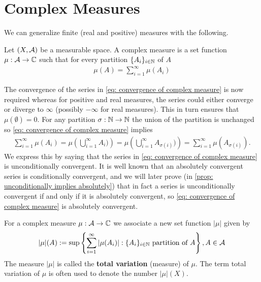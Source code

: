 \section{Complex Measures}

We can generalize finite (real and positive) measures with the following.

\begin{definition}
Let $(X, \mathcal{A})$ be a measurable space. A complex measure is a set function $\mu: \mathcal{A} \to \mathbb{C}$ such that for every partition $\{A_{i}\}_{i\in \mathbb{N}}$ of $A$
\begin{align}
	\mu(A) = \sum_{i=1}^{\infty}\mu(A_{i}) \label{eq: convergence of complex measure}
\end{align}
\end{definition}
The convergence of the series in \eqref{eq: convergence of complex measure} is now required whereas for positive and real measures, the series could either converge or diverge to $\infty$ (possibly $-\infty$ for real measures). This in turn ensures that $\mu(\emptyset)=0$.
For any partition $\sigma: \mathbb{N} \to \mathbb{N}$ the union of the partition is unchanged so \eqref{eq: convergence of complex measure} implies
\begin{align*}
	\sum_{i=1}^{\infty}\mu(A_{i}) = \mu\left(\bigcup_{i=1}^{\infty}A_{i})\right) = \mu\left(\bigcup_{i=1}^{\infty}A_{\sigma(i)})\right) = \sum_{i=1}^{\infty}\mu(A_{\sigma(i)}).
\end{align*}
We express this by saying that the series in \eqref{eq: convergence of complex measure} is unconditionally convergent. It is well known that an absolutely convergent series is conditionally convergent, and we will later prove (in \cref{prop: unconditionally implies absolutely}) that in fact a series is unconditionally convergent if and only if it is absolutely convergent, so \eqref{eq: convergence of complex measure} is absolutely convergent.

\begin{definition}
For a complex measure $\mu: \mathcal{A} \to \mathbb{C}$ we associate a new set function $|\mu|$ given by
\begin{align*}
	|\mu|(A) := \sup\left\{ \sum_{i=1}^{\infty} |\mu(A_{i}) | : \{A_{i}\}_{i\in \mathbb{N}} \text{ partition of } A \right\}, A \in \mathcal{A}
\end{align*}
The measure $|\mu|$ is called the \textbf{total variation} (measure) of $\mu$. The term total variation of $\mu$ is often used to denote the number $|\mu|(X)$.
\end{definition}

